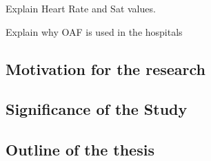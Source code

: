 Explain Heart Rate and Sat values. 

Explain why OAF is used in the hospitals


\subsection{Motivation for the research}

\subsection{Significance of the Study}


\subsection{Outline of the thesis}



